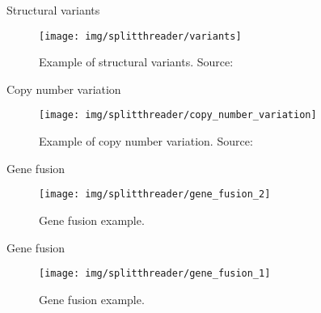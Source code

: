 \documentclass[10pt]{beamer}
\newcommand{\1}{
	\setbeamertemplate{background}{
		\texttt{[image: img/1]}
		\tikz[overlay] \fill[fill opacity=0.75,fill=white] (0,0) rectangle (-\paperwidth,\paperheight);
	}
}
\begin{document}
\begin{frame}{Structural variants}{}
	\begin{figure}[h]
		\centering
		\texttt{[image: img/splitthreader/variants]}
		\caption{Example of structural variants. Source: \cite{sv_pacbio_2021}}
		\label{fig:variants}
	\end{figure}	
\end{frame}

\begin{frame}{Copy number variation}{}
	\begin{figure}[h]
		\centering
		\texttt{[image: img/splitthreader/copy\_number\_variation]}
		\caption{Example of copy number variation. Source: \cite{cnv_nih_2021}}
		\label{fig:cnv}
	\end{figure}	
\end{frame}


\begin{frame}{Gene fusion}{}
	\begin{figure}[h]
		\centering
		\texttt{[image: img/splitthreader/gene\_fusion\_2]}
		\caption{Gene fusion example.}
		\label{fig:cnv}
	\end{figure}	
\end{frame}


\begin{frame}{Gene fusion}{}
	\begin{figure}[h]
		\centering
		\texttt{[image: img/splitthreader/gene\_fusion\_1]}
		\caption{Gene fusion example.}
		\label{fig:cnv}
	\end{figure}	
\end{frame}
\end{document}
